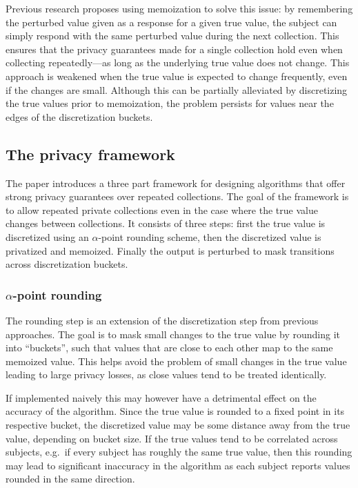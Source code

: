\documentclass[a4paper,12pt]{article}
\begin{document}
Previous research \cite{google_rappor} proposes using memoization to solve this issue: by remembering the perturbed value given as a response for a given true value, the subject can simply respond with the same perturbed value during the next collection. This ensures that the privacy guarantees made for a single collection hold even when collecting repeatedly---as long as the underlying true value does not change. This approach is weakened when the true value is expected to change frequently, even if the changes are small. Although this can be partially alleviated by discretizing the true values prior to memoization, the problem persists for values near the edges of the discretization buckets.

\subsection{The privacy framework \label{sec:framework}}

The paper \cite{microsoft_telemetry} introduces a three part framework for designing algorithms that offer strong privacy guarantees over repeated collections. The goal of the framework is to allow repeated private collections even in the case where the true value changes between collections. It consists of three steps: first the true value is discretized using an $\alpha$-point rounding scheme, then the discretized value is privatized and memoized. Finally the output is perturbed to mask transitions across discretization buckets.

\subsubsection{$\alpha$-point rounding \label{sec:alpha_rounding}}

The rounding step is an extension of the discretization step from previous approaches. The goal is to mask small changes to the true value by rounding it into ``buckets'', such that values that are close to each other map to the same memoized value. This helps avoid the problem of small changes in the true value leading to large privacy losses, as close values tend to be treated identically.

If implemented naively this may however have a detrimental effect on the accuracy of the algorithm. Since the true value is rounded to a fixed point in its respective bucket, the discretized value may be some distance away from the true value, depending on bucket size. If the true values tend to be correlated across subjects, e.g.\ if every subject has roughly the same true value, then this rounding may lead to significant inaccuracy in the algorithm as each subject reports values rounded in the same direction.
\end{document}
